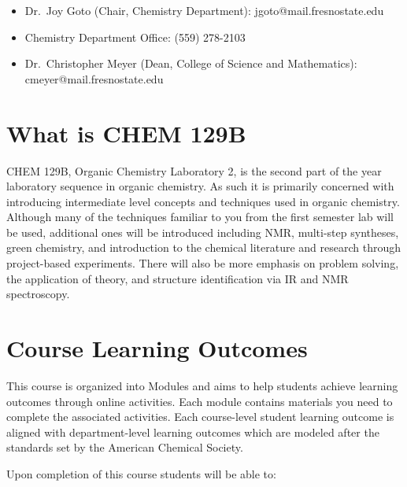 \begin{itemize}
\tightlist
\item
  Dr.~Joy Goto (Chair, Chemistry Department): jgoto@mail.fresnostate.edu
\item
  Chemistry Department Office: (559) 278-2103
\item
  Dr.~Christopher Meyer (Dean, College of Science and Mathematics):
  cmeyer@mail.fresnostate.edu
\end{itemize}

\hypertarget{what-is-chem-129b}{%
\section{What is CHEM 129B}\label{what-is-chem-129b}}

CHEM 129B, Organic Chemistry Laboratory 2, is the second part of the
year laboratory sequence in organic chemistry. As such it is primarily
concerned with introducing intermediate level concepts and techniques
used in organic chemistry. Although many of the techniques familiar to
you from the first semester lab will be used, additional ones will be
introduced including NMR, multi-step syntheses, green chemistry, and
introduction to the chemical literature and research through
project-based experiments. There will also be more emphasis on problem
solving, the application of theory, and structure identification via IR
and NMR spectroscopy.

\hypertarget{course-learning-outcomes}{%
\section{Course Learning Outcomes}\label{course-learning-outcomes}}

This course is organized into Modules and aims to help students achieve
learning outcomes through online activities. Each module contains
materials you need to complete the associated activities. Each
course-level student learning outcome is aligned with department-level
learning outcomes which are modeled after the standards set by the
American Chemical Society.

Upon completion of this course students will be able to:

